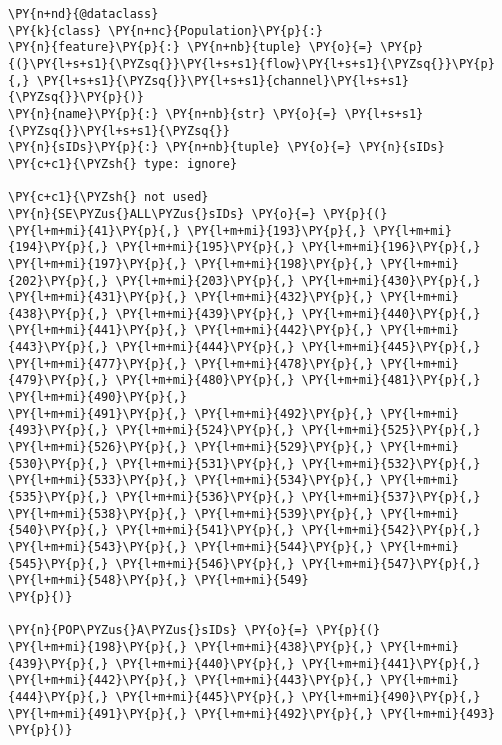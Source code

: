 \begin{tcolorbox}[breakable, size=fbox, boxrule=1pt, pad at break*=1mm,colback=cellbackground, colframe=cellborder]
\begin{Verbatim}[commandchars=\\\{\}]
\PY{n+nd}{@dataclass}
\PY{k}{class} \PY{n+nc}{Population}\PY{p}{:}
\PY{n}{feature}\PY{p}{:} \PY{n+nb}{tuple} \PY{o}{=} \PY{p}{(}\PY{l+s+s1}{\PYZsq{}}\PY{l+s+s1}{flow}\PY{l+s+s1}{\PYZsq{}}\PY{p}{,} \PY{l+s+s1}{\PYZsq{}}\PY{l+s+s1}{channel}\PY{l+s+s1}{\PYZsq{}}\PY{p}{)}
\PY{n}{name}\PY{p}{:} \PY{n+nb}{str} \PY{o}{=} \PY{l+s+s1}{\PYZsq{}}\PY{l+s+s1}{\PYZsq{}}
\PY{n}{sIDs}\PY{p}{:} \PY{n+nb}{tuple} \PY{o}{=} \PY{n}{sIDs}  \PY{c+c1}{\PYZsh{} type: ignore}

\PY{c+c1}{\PYZsh{} not used}
\PY{n}{SE\PYZus{}ALL\PYZus{}sIDs} \PY{o}{=} \PY{p}{(}
\PY{l+m+mi}{41}\PY{p}{,} \PY{l+m+mi}{193}\PY{p}{,} \PY{l+m+mi}{194}\PY{p}{,} \PY{l+m+mi}{195}\PY{p}{,} \PY{l+m+mi}{196}\PY{p}{,} \PY{l+m+mi}{197}\PY{p}{,} \PY{l+m+mi}{198}\PY{p}{,} \PY{l+m+mi}{202}\PY{p}{,} \PY{l+m+mi}{203}\PY{p}{,} \PY{l+m+mi}{430}\PY{p}{,} \PY{l+m+mi}{431}\PY{p}{,} \PY{l+m+mi}{432}\PY{p}{,} \PY{l+m+mi}{438}\PY{p}{,} \PY{l+m+mi}{439}\PY{p}{,} \PY{l+m+mi}{440}\PY{p}{,} \PY{l+m+mi}{441}\PY{p}{,} \PY{l+m+mi}{442}\PY{p}{,} \PY{l+m+mi}{443}\PY{p}{,} \PY{l+m+mi}{444}\PY{p}{,} \PY{l+m+mi}{445}\PY{p}{,} \PY{l+m+mi}{477}\PY{p}{,} \PY{l+m+mi}{478}\PY{p}{,} \PY{l+m+mi}{479}\PY{p}{,} \PY{l+m+mi}{480}\PY{p}{,} \PY{l+m+mi}{481}\PY{p}{,} \PY{l+m+mi}{490}\PY{p}{,}
\PY{l+m+mi}{491}\PY{p}{,} \PY{l+m+mi}{492}\PY{p}{,} \PY{l+m+mi}{493}\PY{p}{,} \PY{l+m+mi}{524}\PY{p}{,} \PY{l+m+mi}{525}\PY{p}{,} \PY{l+m+mi}{526}\PY{p}{,} \PY{l+m+mi}{529}\PY{p}{,} \PY{l+m+mi}{530}\PY{p}{,} \PY{l+m+mi}{531}\PY{p}{,} \PY{l+m+mi}{532}\PY{p}{,} \PY{l+m+mi}{533}\PY{p}{,} \PY{l+m+mi}{534}\PY{p}{,} \PY{l+m+mi}{535}\PY{p}{,} \PY{l+m+mi}{536}\PY{p}{,} \PY{l+m+mi}{537}\PY{p}{,} \PY{l+m+mi}{538}\PY{p}{,} \PY{l+m+mi}{539}\PY{p}{,} \PY{l+m+mi}{540}\PY{p}{,} \PY{l+m+mi}{541}\PY{p}{,} \PY{l+m+mi}{542}\PY{p}{,} \PY{l+m+mi}{543}\PY{p}{,} \PY{l+m+mi}{544}\PY{p}{,} \PY{l+m+mi}{545}\PY{p}{,} \PY{l+m+mi}{546}\PY{p}{,} \PY{l+m+mi}{547}\PY{p}{,} \PY{l+m+mi}{548}\PY{p}{,} \PY{l+m+mi}{549}
\PY{p}{)}

\PY{n}{POP\PYZus{}A\PYZus{}sIDs} \PY{o}{=} \PY{p}{(}
\PY{l+m+mi}{198}\PY{p}{,} \PY{l+m+mi}{438}\PY{p}{,} \PY{l+m+mi}{439}\PY{p}{,} \PY{l+m+mi}{440}\PY{p}{,} \PY{l+m+mi}{441}\PY{p}{,} \PY{l+m+mi}{442}\PY{p}{,} \PY{l+m+mi}{443}\PY{p}{,} \PY{l+m+mi}{444}\PY{p}{,} \PY{l+m+mi}{445}\PY{p}{,} \PY{l+m+mi}{490}\PY{p}{,} \PY{l+m+mi}{491}\PY{p}{,} \PY{l+m+mi}{492}\PY{p}{,} \PY{l+m+mi}{493}
\PY{p}{)}


\end{Verbatim}
\end{tcolorbox}
